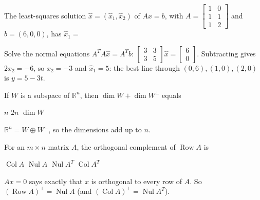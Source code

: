 \begin{question}[id=orth-6, marks=2]
The least-squares solution $\hat{x} = (\hat{x}_1, \hat{x}_2)$ of $Ax = b$, with $A = \begin{bmatrix} 1 & 0 \\ 1 & 1 \\ 1 & 2 \end{bmatrix}$ and $b = (6, 0, 0)$, has $\hat{x}_1 =$
\begin{solution}
Solve the normal equations $A^TA\hat{x} = A^Tb$: $\begin{bmatrix} 3 & 3 \\ 3 & 5 \end{bmatrix}\hat{x} = \begin{bmatrix} 6 \\ 0 \end{bmatrix}$. Subtracting gives $2\hat{x}_2 = -6$, so $\hat{x}_2 = -3$ and $\hat{x}_1 = 5$: the best line through $(0, 6), (1, 0), (2, 0)$ is $y = 5 - 3t$.
\end{solution}
\end{question}

\begin{question}[id=orth-7]
If $W$ is a subspace of $\mathbb{R}^n$, then $\dim W + \dim W^\perp$ equals
\begin{options}
  \correct $n$
  \option $2n$
  \option $\dim W$
\end{options}
\begin{solution}
$\mathbb{R}^n = W \oplus W^\perp$, so the dimensions add up to $n$.
\end{solution}
\end{question}

\begin{question}[id=orth-8, marks=2]
For an $m \times n$ matrix $A$, the orthogonal complement of $\operatorname{Row} A$ is
\begin{options}
  \option $\operatorname{Col} A$
  \correct $\operatorname{Nul} A$
  \option $\operatorname{Nul} A^T$
  \option $\operatorname{Col} A^T$
\end{options}
\begin{solution}
$Ax = 0$ says exactly that $x$ is orthogonal to every row of $A$. So $(\operatorname{Row} A)^\perp = \operatorname{Nul} A$ (and $(\operatorname{Col} A)^\perp = \operatorname{Nul} A^T$).
\end{solution}
\end{question}

